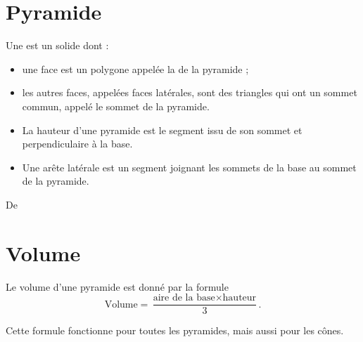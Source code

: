 


\section{Pyramide}

\begin{definition}
    Une  est un solide dont :
    \begin{itemize}
        \item 
            une face est un polygone appelée la  de la pyramide ;
\item
les autres faces, appelées faces latérales, sont des triangles qui ont un sommet commun, appelé le sommet de la pyramide.
    \end{itemize}
\end{definition}


\begin{definition}
    \begin{itemize}
        \item 
La hauteur d'une pyramide est le segment issu de son sommet et perpendiculaire à la base.
\item
Une arête latérale est un segment joignant les sommets de la base au sommet de la pyramide.
    \end{itemize}
\end{definition}


De \cite{NRHooXFvgpp4}

\section{Volume}

\begin{propriete}
    Le volume d'une pyramide est donné par la formule
    \begin{equation}
        \text{Volume}=\frac{ \text{aire de la base}\times \text{hauteur} }{ 3 }.
    \end{equation}
\end{propriete}
Cette formule fonctionne pour toutes les pyramides, mais aussi pour les cônes.


